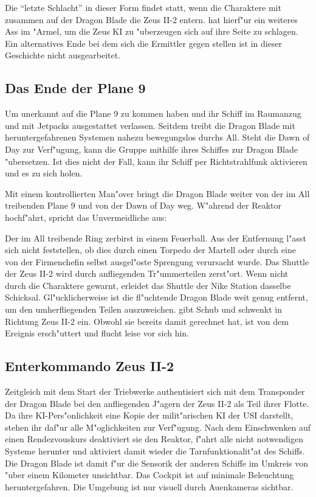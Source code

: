 
Die "`letzte Schlacht"' in dieser Form findet statt, wenn die Charaktere mit \xl{} zusammen auf der Dragon Blade die Zeus II-2 entern. \xl{} hat hierf"ur ein weiteres Ass im "Armel, um die Zeus KI zu "uberzeugen sich auf ihre Seite zu schlagen. Ein alternatives Ende bei dem sich die Ermittler gegen \xl{} stellen ist in dieser Geschichte nicht ausgearbeitet.

\subsection{Das Ende der Plane 9}
Um unerkannt auf die Plane 9 zu kommen haben \xl{} und \ml{} ihr Schiff im Raumanzug und mit Jetpacks ausgestattet verlassen. Seitdem treibt die Dragon Blade mit heruntergefahrenen Systemen nahezu bewegungslos durchs All. Steht die Dawn of Day zur Verf"ugung, kann die Gruppe mithilfe ihres Schiffes zur Dragon Blade "ubersetzen. Ist dies nicht der Fall, kann \xl{} ihr Schiff per Richtstrahlfunk aktivieren und es zu sich holen.

Mit einem kontrollierten Man"over bringt \xl{} die Dragon Blade weiter von der im All treibenden Plane 9 und von der Dawn of Day weg. W"ahrend der Reaktor hochf"ahrt, spricht \xl{} das Unvermeidliche aus:


Der im All treibende Ring zerbirst in einem Feuerball. Aus der Entfernung l"asst sich nicht feststellen, ob dies durch einen Torpedo der Martell oder durch eine von der Firmenchefin selbst ausgel"oste Sprengung verursacht wurde. Das Shuttle der Zeus II-2 wird durch anfliegenden Tr"ummerteilen zerst"ort. Wenn nicht durch die Charaktere gewarnt, erleidet das Shuttle der Nike Station dasselbe Schicksal. Gl"ucklicherweise ist die fl"uchtende Dragon Blade weit genug entfernt, um den umherfliegenden Teilen auszuweichen. \xl{} gibt Schub und schwenkt in Richtung Zeus II-2 ein. Obwohl sie bereits damit gerechnet hat, ist \ml{} von dem Ereignis ersch"uttert und flucht leise vor sich hin.

\subsection{Enterkommando Zeus II-2}
Zeitgleich mit dem Start der Triebwerke authentisiert sich \xl{} mit dem Transponder der Dragon Blade bei den anfliegenden J"agern der Zeus II-2 als Teil ihrer Flotte. Da ihre KI-Pers"onlichkeit eine Kopie der milit"arischen KI der USI darstellt, stehen ihr daf"ur alle M"oglichkeiten zur Verf"ugung. Nach dem Einschwenken auf einen Rendezvouskurs deaktiviert sie den Reaktor, f"ahrt alle nicht notwendigen Systeme herunter und aktiviert damit wieder die Tarnfunktionalit"at des Schiffs. Die Dragon Blade ist damit f"ur die Sensorik der anderen Schiffe im Umkreis von "uber einem Kilometer unsichtbar. Das Cockpit ist auf minimale Beleuchtung heruntergefahren. Die Umgebung ist nur visuell durch Au\3enkameras sichtbar.


